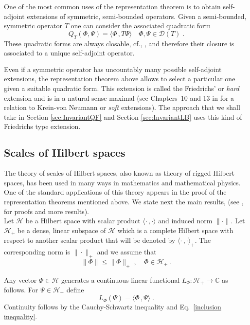 \documentclass[a4paper,12pt]{amsart}
\newcommand{\scalar}[2]{\langle#1\,,#2\rangle}
\newcommand{\norm}[1]{\|#1\|}
\renewcommand{\H}{\mathcal{H}}
\newcommand{\D}{\mathcal{D}}
\newcommand{\1}{\mathbb{I}}
\numberwithin{equation}{section}
\numberwithin{theorem}{section}
\begin{document}
One of the most common uses of the representation theorem is to obtain self-adjoint extensions of symmetric, semi-bounded operators.
Given a semi-bounded, symmetric operator $T$ one can consider the associated quadratic form
$$Q_T(\Phi,\Psi)=\scalar{\Phi}{T\Psi}\quad \Phi,\Psi\in\D(T)\;.$$ These quadratic forms are always closable,
cf., \cite[Theorem X.23]{reed75}, and therefore their closure is associated to a unique self-adjoint operator.


Even if a symmetric operator has uncountably many possible self-adjoint extensions, the representation theorem above
allows to select a particular one given a suitable quadratic form. This extension is called the Friedrichs' or {\em hard}
extension and is in a natural sense maximal (see Chapters~10 and 13 in \cite{schmuedgen12} for a relation to Krein-von Neumann
or {\em soft} extensions).
The approach that we shall take in Section \ref{sec:InvariantQF} and Section \ref{sec:InvariantLB} uses this kind of
Friedrichs type extension.


\subsection{Scales of Hilbert spaces}
\label{sec:scalesHs}

The theory of scales of Hilbert spaces, also known as theory of rigged Hilbert spaces, has been used in
many ways in mathematics and mathematical physics. One of the standard applications of this theory appears in the
proof of the representation theorems mentioned above. We state next the main results,
(see \cite[Chapter I]{berezanskii68}, \cite[Chapter 2]{koshmanenko99} for proofs and more results).\\

Let $\H$ be a Hilbert space with scalar product $\scalar{\cdot}{\cdot}$ and induced norm $\norm{\cdot}$. Let $\H_+$ be a dense, linear
subspace of $\H$ which is a complete Hilbert space with respect to another scalar product that will be denoted by $\scalar{\cdot}{\cdot}_+$.
The corresponding norm is $\norm{\cdot}_+$ and we assume that
%
\begin{equation}\label{inclusion inequality}
\norm{\Phi}\leq\norm{\Phi}_+\;,\quad \Phi\in\H_+\;.
\end{equation}
%

Any vector $\Phi\in\H$ generates a continuous linear functional $L_\Phi\colon\H_+\to \mathbb{C}$  as follows. For $\Psi\in\H_+$ define
%
\begin{equation}
L_{\Phi}(\Psi)=\scalar{\Phi}{\Psi}\;.
\end{equation}
%
Continuity follows by the Cauchy-Schwartz inequality and Eq.~\eqref{inclusion inequality}.
\end{document}
